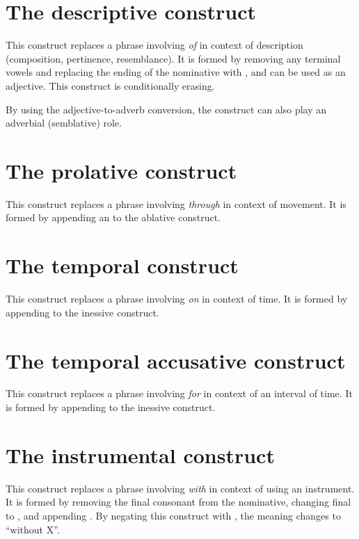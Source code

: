 \documentclass{book}
\begin{document}
\section{The descriptive construct}

This construct replaces a phrase involving  \emph{of} in context of description (composition, pertinence, resemblance). It is formed by removing any terminal vowels and replacing the ending of the nominative with , and can be used as an adjective. This construct is conditionally erasing.

By using the adjective-to-adverb conversion, the construct can also play an adverbial (semblative) role.

\section{The prolative construct}

This construct replaces a phrase involving  \emph{through} in context of movement. It is formed by appending an  to the ablative construct.

\section{The temporal construct}

This construct replaces a phrase involving  \emph{on} in context of time. It is formed by appending  to the inessive construct.

\section{The temporal accusative construct}

This construct replaces a phrase involving  \emph{for} in context of an interval of time. It is formed by appending  to the inessive construct.

\section{The instrumental construct}

This construct replaces a phrase involving  \emph{with} in context of using an instrument. It is formed by removing the final consonant from the nominative, changing final  to , and appending . By negating this construct with , the meaning changes to ``without X''.
\end{document}

